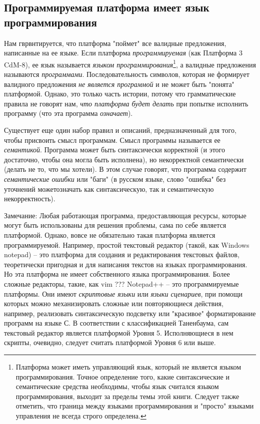 \subsection{Программируемая платформа имеет язык программирования}

Нам гврвнтируется, что платформа "поймет" все валидные предложения, написанные на ее языке.  Если платформа \emph{программируемая} (как Платформа 3 CdM-8), ее язык называется \emph{языком программирования}\footnote{Платформа может иметь управляющий язык, который не является языком программирования.  Точное определение того, какие синтаксические и семантические средства необходимы, чтобы язык считался языком программирования, выходит за пределы темы этой книги. Следует также отметить, что граница между языками программирования и "просто" языками управления не всегда строго определена.}, а валидные предложения называются \emph{программами}.  Последовательность символов, которая не формирует валидного предложения  \emph{не является программой} и не может быть "понята" платформой.  Однако, это только часть истории, потому что грамматические правила не говорят нам, \emph{что платформа будет делать} при попытке исполнить программу (что эта программа \emph{означает}).

Существует еще один набор правил и описаний, предназначенный для того, чтобы присвоить смысл программам.  Смысл программы называется ее  \emph{семантикой}.  Программа может быть синтаксически корректной (и этого достаточно, чтобы она могла быть исполнена), но некорректной семантически (делать не то, что мы хотели).  В этом случае говорят, что программа содержит \emph{семантические ошибки} или "баги" (в русском языке, слово "ошибка" без уточнений можетозначать как синтаксическую, так и семантическую некорректность).

Замечание: Любая работающая программа, предоставляющая ресурсы, которые могут быть использованы для решения проблемы, сама по себе является платформой.  Однако, вовсе не обязательно такая платформа является программируемой.  Например, простой текстовый редактор (такой, как Windows notepad) -- это платформа для создания и редактирования текстовых файлов, теоретически пригодная и для написания текстов на языках программирования.  Но эта платформа не имеет  собственного языка программирования.  Более сложные редакторы, такие, как  vim ??? Notepad++ -- это программируемые платформы.  Они имеют \emph{скриптовые языки} или \emph{языки сценариев}, при помощи которых можно механизировать сложные или повторяющиеся действия, например, реализовать синтаксическую подсветку или "красивое" форматирование программ на языке С.  В соответствии с классификацией Таненбаума, сам текстовый редактор является платформой Уровня 5.  Исполняющиеся в нем скрипты, очевидно, следует считать платформой Уровня 6 или выше.

